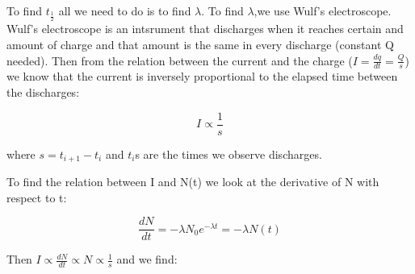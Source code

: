 \documentclass[10pt,a4paper]{article}
\begin{document}
{\par To find $t_{\frac{1}{2}}$ all we need to do is to find $\lambda$. To find $\lambda$,we use Wulf's electroscope. Wulf's electroscope is an intsrument that discharges when it reaches certain and amount of charge and that amount is the same in every discharge (constant Q needed). Then from the relation between the current  and the charge ($I=\frac{dq}{dt}=\frac{Q}{s}$) we know that the current is inversely proportional to the elapsed time between the discharges:
\begin{center}
\begin{equation}
I\propto \frac{1}{s}
\end{equation}
\end{center}
\par where $s=t_{i+1}-t_i$ and $t_i$s are the times we observe discharges.
\\[\baselineskip]
\par To find the relation between I and N(t) we look at the derivative of N with respect to t:
\begin{center}
	\begin{equation}
	\frac{dN}{dt}=-\lambda {N}_{0}{e}^{-\lambda t}=-\lambda N\left(t\right)
	\end{equation}
\end{center}
 Then $I\propto \frac{dN}{dt} \propto N \propto \frac{1}{s}$ and we find:

}
\end{document}
